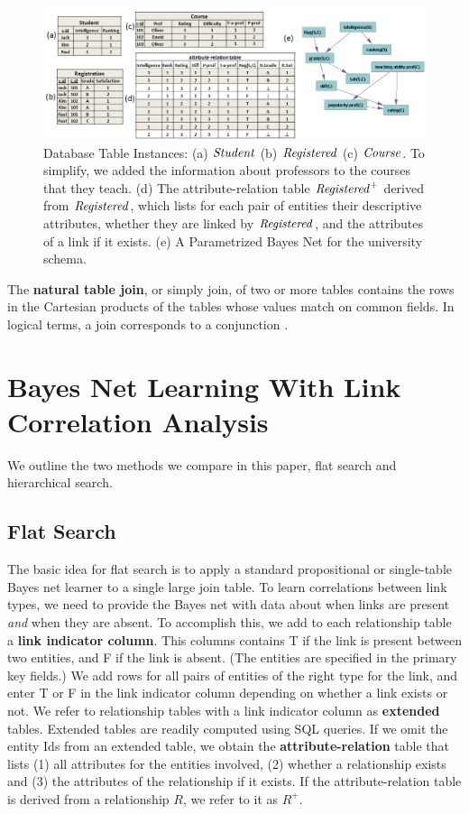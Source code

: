 \documentclass[runningheads,a4paper]{llncs}
\begin{document}
\begin{figure}[htbp] %
   \centering
   \includegraphics[width=\textwidth]{figures/university-tables3.png} 
  \caption{Database Table Instances: (a) $\mathit{Student}$ (b) $\mathit{Registered}$ (c) $\mathit{Course}$. To simplify, we added the information about professors to the courses that they teach.  (d) The attribute-relation table $\mathit{Registered}^{+}$ derived from $\mathit{Registered}$, which lists for each pair of entities their descriptive attributes, whether they are linked by $\mathit{Registered}$, and the attributes of a link if it exists. (e) A Parametrized Bayes Net for the university schema.}
   \label{fig:university-tables}
\end{figure}


 The \textbf{natural table join}, or simply join, of two or more tables contains the rows in the Cartesian products of the tables whose values match on common fields. In logical terms, a join corresponds to a conjunction \cite{Ullman1982}. 
 
\section{Bayes Net Learning With Link Correlation Analysis}

We outline the two methods we compare in this paper, flat search and hierarchical search. 

\subsection{Flat Search}
The basic idea for flat search is to apply a standard propositional or single-table Bayes net learner to a single large join table. 
To learn correlations between link types, we need to provide the Bayes net with data about when links are present {\em and} when they are absent. To accomplish this, we add to each relationship table a \textbf{link indicator column}. This columns contains T if the link is present between two entities, and F if the link is absent. (The entities are specified in the primary key fields.) We add rows for all pairs of entities of the right type for the link, and enter T or F in the link indicator column depending on whether a link exists or not. We refer to relationship tables with a link indicator column as \textbf{extended} tables. Extended tables are readily computed using SQL queries. If we omit the entity Ids from an extended table, we obtain the \textbf{attribute-relation} table that lists (1) all attributes for the entities involved, (2) whether a relationship exists and (3) the attributes of the relationship if it exists. If the attribute-relation table is derived from a relationship $R$, we refer to it as $R^{+}$. 
\end{document}
